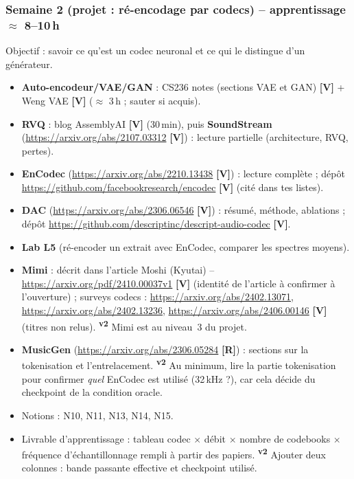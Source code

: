 \documentclass[11pt,a4paper]{article}
\providecommand{\og}{\guillemotleft\nobreakspace}%
\providecommand{\fg}{\nobreakspace\guillemotright}}
\newcommand{\sS}{\ding{72}}   %
\newcommand{\sO}{\ding{73}}   %
\newcommand{\vtwo}{\textsuperscript{\textcolor{orange!80!black}{\textbf{v2}}}}
\newcommand{\lV}{\textbf{\textcolor{green!45!black}{[V]}}}
\newcommand{\lR}{\textbf{\textcolor{orange!80!black}{[R]}}}
\begin{document}
\subsubsection{Semaine 2 (projet : ré-encodage par codecs) -- apprentissage $\approx$ 8--10\,h}
Objectif : savoir ce qu'est un codec neuronal et ce qui le distingue d'un générateur.
\begin{itemize}
\item \textbf{\sS} \textbf{Auto-encodeur/VAE/GAN} : CS236 notes (sections VAE et GAN) \lV{} + Weng VAE \lV{} ($\approx$ 3\,h ; sauter si acquis).
\item \textbf{\sS} \textbf{RVQ} : blog AssemblyAI \lV{} (30\,min), puis \textbf{SoundStream} (\url{https://arxiv.org/abs/2107.03312} \lV) : lecture partielle (architecture, RVQ, pertes).
\item \textbf{\sS} \textbf{EnCodec} (\url{https://arxiv.org/abs/2210.13438} \lV) : lecture complète ; dépôt \url{https://github.com/facebookresearch/encodec} \lV{} (cité dans tes listes).
\item \textbf{\sS} \textbf{DAC} (\url{https://arxiv.org/abs/2306.06546} \lV) : résumé, méthode, ablations ; dépôt \url{https://github.com/descriptinc/descript-audio-codec} \lV.
\item \textbf{\sS} \textbf{Lab L5} (ré-encoder un extrait avec EnCodec, comparer les spectres moyens).
\item \textbf{\sO} \textbf{Mimi} : décrit dans l'article Moshi (Kyutai) -- \url{https://arxiv.org/pdf/2410.00037v1} \lV{} (identité de l'article à confirmer à l'ouverture) ; surveys codecs : \url{https://arxiv.org/abs/2402.13071}, \url{https://arxiv.org/abs/2402.13236}, \url{https://arxiv.org/abs/2406.00146} \lV{} (titres non relus). \vtwo{} Mimi est au niveau~3 du projet.
\item \textbf{\sO} \textbf{MusicGen} (\url{https://arxiv.org/abs/2306.05284} \lR) : sections sur la tokenisation et l'entrelacement. \vtwo{} Au minimum, lire la partie tokenisation pour confirmer \emph{quel} EnCodec est utilisé (32\,kHz ?), car cela décide du checkpoint de la condition oracle.
\item Notions : N10, N11, N13, N14, N15.
\item Livrable d'apprentissage : tableau \og{}codec $\times$ débit $\times$ nombre de codebooks $\times$ fréquence d'échantillonnage\fg{} rempli à partir des papiers. \vtwo{} Ajouter deux colonnes : bande passante effective et checkpoint utilisé.
\end{itemize}
\end{document}
